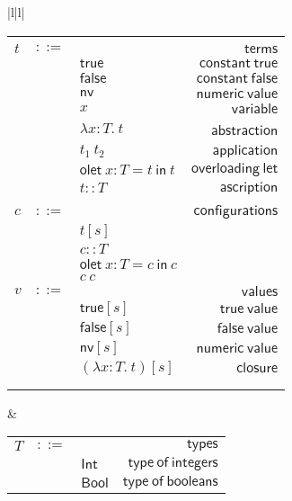 \documentclass[preprint,authoryear,sort&compress,9pt,nocopyrightspace]{article}
\newcommand{\conf}[2][s]{(#2)[#1]}
\newcommand{\ascrip}[1]{#1::T}
\newcommand{\oletD}{\mathsf{olet} \ x : T = t \ \mathsf{in}  \ t}
\newcommand{\oletP}[3]{\mathsf{olet} \ x : #1 = #2 \ \mathsf{in}  \ #3}
\newcommand{\app}[2]{#1 \ #2}
\newcommand{\abs}[3]{\lambda #1:#2. \ #3}
\newcommand{\truet}{\mathsf{true}}
\newcommand{\falset}{\mathsf{false}}
\newcommand{\boolt}{\mathsf{Bool}}
\newcommand{\intt}{\mathsf{Int}}
\newcommand{\nvt}{\mathsf{nv}}
\begin{document}
\begin{figure}
\begin{small}
\begin{center}
\begin{tabular}{|l|l|}
\hline
\begin{tabular}{l c l r}
&&&\\
$t$&$::=$&&$\mathsf {terms}$\\
&&$\truet$&$\mathsf {constant \ true}$\\
&&$\falset$&$\mathsf {constant \ false}$\\
&&$\nvt$&$\mathsf {numeric \ value}$\\
&&$x$&$\mathsf {variable}$\\
&&$\abs {x}{T}{t}$&\ $\mathsf {abstraction}$\\
&&$\app {t_1}{t_2}$&$\mathsf {application}$\\
&&$\oletD$&$\mathsf {overloading \ let}$\\
&&$\ascrip {t}$&$\mathsf {ascription}$\\
&&&\\
$c$&$::=$&&$\mathsf {configurations}$\\
&&$t[s]$&\\
&&$\ascrip{c}$&\\
&&$\oletP {T}{c}{c}$&\\
&&$c \ c $&\\
$v$&$::=$&&$\mathsf {values}$\\
&&$\truet[s]$&$\mathsf {true \ value}$\\
&&$\falset[s]$&$\mathsf {false \ value}$\\
&&$\nvt[s]$&$\mathsf {numeric \ value}$\\
&&$\conf {\abs {x}{T}{t}}$&$\mathsf {closure}$\\
&&&\\
&&&\\
\end{tabular}
& \begin{tabular}{l c l r}
$T$&$::=$&&$\mathsf {types}$\\
&&$\intt$&$\mathsf {type \ of \ integers}$\\
&&$\boolt$&$\mathsf {type \ of \ booleans}$\\

\end{tabular}
\end{tabular}
\end{center}
\end{small}
\end{figure}
\end{document}
